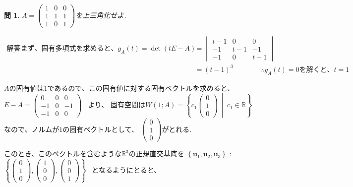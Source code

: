 \documentclass{jsarticle}
\newtheorem{question}{問}
\begin{document}
\begin{question}
$A=\begin{pmatrix} 1&0&0 \\ 1&1&1 \\ 1&0&1 \end{pmatrix}$を上三角化せよ.
\end{question}

\bigskip

\begin{align*}
\underline{\textbf{解答}}　まず、固有多項式を求めると、
g_{A}(t) = \det (tE-A)
&=\begin{vmatrix} t-1&0&0 \\ -1&t-1&-1 \\ -1&0&t-1 \end{vmatrix} \\
&= (t-1)^3 \ \ \ \ \ \ \ \ \ \ \ \ \ \ \ \ \ \ \therefore g_{A}(t) = 0を解くと、t=1
\end{align*}

$A$の固有値は$1$であるので、この固有値に対する固有ベクトルを求めると、
$E-A = \begin{pmatrix} 0&0&0 \\ -1&0&-1 \\ -1&0&0 \end{pmatrix}$ \ より、
固有空間は$W(1;A) = \left\{c_1\begin{pmatrix} 0 \\ 1 \\ 0 \end{pmatrix} \ \middle| \ c_1\in \mathbb{R} \right\}$なので、ノルムが$1$の固有ベクトルとして、
$\begin{pmatrix} 0 \\ 1 \\ 0 \end{pmatrix}$がとれる.

このとき、このベクトルを含むような$\mathbb{R}^3$の正規直交基底を
$\left\{\bm{u}_1 , \bm{u}_2, \bm{u}_3 \right\}$ :=
$\left\{\begin{pmatrix} 0 \\ 1 \\ 0 \end{pmatrix} , \begin{pmatrix} 1 \\ 0 \\ 0 \end{pmatrix} , \begin{pmatrix} 0 \\ 0 \\ 1 \end{pmatrix} \right\}$ \ となるようにとると、
\end{document}
